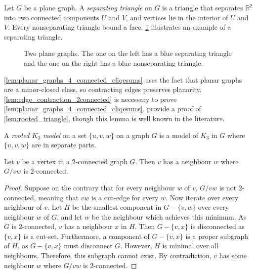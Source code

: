 Let $G$ be a plane graph. A \textit{separating triangle} on $G$ is a triangle that separates $\mathbb{R}^2$ into two connected components $U$ and $V$, and vertices lie in the interior of $U$ and $V$. Every nonseparating triangle bound a face. \cref{fig:separating_triangle} illustrates an example of a separating triangle. 
\begin{figure}[h!]
	\centering
	
	\caption[Separating faces]{Two plane graphs. The one on the left has a blue separating triangle and the one on the right has a blue nonseparating triangle.}\label{fig:separating_triangle}
\end{figure}

\cref{lem:planar_graphs_4_connected_cliqesums} uses the fact that planar graphs are a minor-closed class, so contracting edges preserves planarity. \cref{lem:edge_contraction_2connected} is necessary to prove \cref{lem:planar_graphs_4_connected_cliqesums}. \textcite{woodThomassensChoosabilityArgument2010} provide a proof of \cref{lem:rooted_triangle}, though this lemma is well known in the literature. 

A \textit{rooted $K_3$ model} on a set $\{u, v, w\}$ on a graph $G$ is a model of $K_3$ in $G$ where $\{u, v, w\}$ are in separate parts. 

\begin{lemma}\label{lem:edge_contraction_2connected}
	Let $v$ be a vertex in a 2-connected graph $G$. Then $v$ has a neighbour $w$ where $G/vw$ is 2-connected.
\end{lemma}
\begin{proof}
	Suppose on the contrary that for every neighbour $w$ of $v$, $G/vw$ is not $2$-connected, meaning that $vw$ is a cut-edge for every $w$. Now iterate over every neighbour of $v$. Let $H$ be the smallest component in $G - \{v,w\}$ over every neighbour $w$ of $G$, and let $w$ be the neighbour which achieves this minimum. As $G$ is $2$-connected, $v$ has a neighbour $x$ in $H$. Then $G - \{v, x\}$ is disconnected as $\{v,x\}$ is a cut-set. Furthermore, a component of $G - \{v,x\}$ is a proper subgraph of $H$, as $G - \{v, x\}$ must disconnect $G$.  However, $H$ is minimal over all neighbours. Therefore, this subgraph cannot exist. By contradiction, $v$ has some neighbour $w$ where $G/vw$ is $2$-connected. 
\end{proof}

